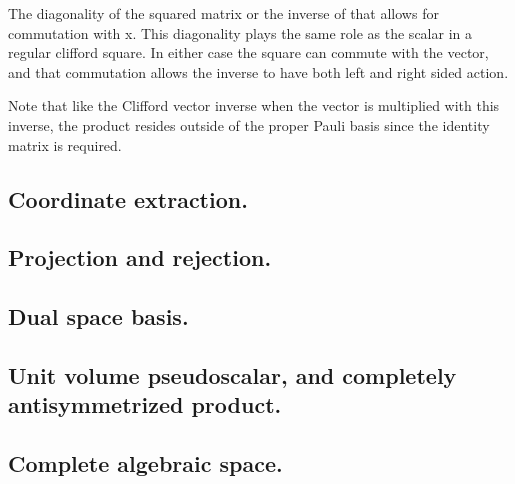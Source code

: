 \documentclass{article}
\begin{document}
The diagonality of the squared matrix or the inverse of that allows for commutation with x.  This diagonality plays the same role as the scalar in a regular clifford square.  In either case the square can commute with the vector, and that 
commutation allows the inverse to have both left and right sided action.

Note that like the Clifford vector inverse when the vector is multiplied with this inverse, the product resides outside of the proper  Pauli basis since the identity matrix is required.

\subsection{ Coordinate extraction. }

\subsection{ Projection and rejection. }

\subsection{ Dual space basis. }

\subsection{ Unit volume pseudoscalar, and completely antisymmetrized product. }

\subsection{ Complete algebraic space. }




\end{document}
